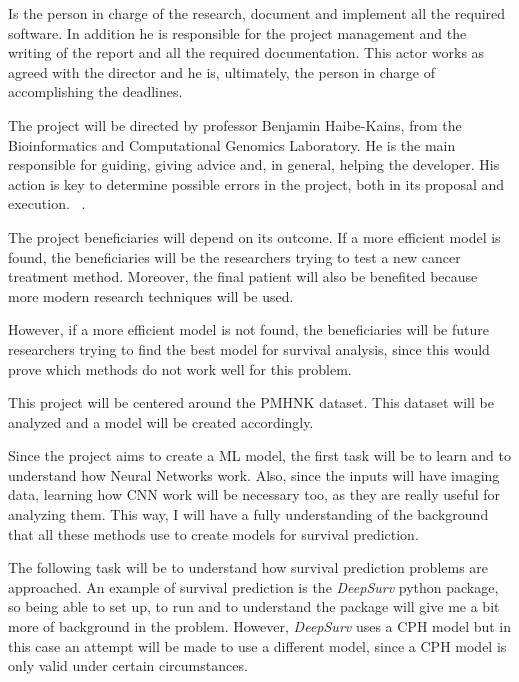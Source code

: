 Is the person in charge of the research, document and implement all the required software.
In addition he is responsible for the project management and the writing of the report
and all the required documentation. This actor works as agreed with the director and
he is, ultimately, the person in charge of accomplishing the deadlines.

The project will be directed by professor Benjamin Haibe-Kains, from the Bioinformatics 
and Computational Genomics Laboratory. He is the main responsible for guiding, giving 
advice and, in general, helping the developer.
His action is key to determine possible errors in the project, both in its proposal and 
execution.
~\cites{bhklab}.

The project beneficiaries will depend on its outcome. If a more efficient model is found, the
beneficiaries will be the researchers trying to test a new cancer treatment method. Moreover,
the final patient will also be benefited because more modern research techniques will be used.

However, if a more efficient model is not found, the beneficiaries will be future researchers
trying to find the best model for survival analysis, since this would prove which 
methods do not work well for this problem.


This project will be centered around the \gls{PMHNK} dataset. This dataset will be analyzed
and a model will be created accordingly.

Since the project aims to create a \gls{ML} model, the first task will be to learn and 
to understand how Neural Networks work. Also, since the inputs will have imaging data, learning
how \gls{CNN} work will be necessary too, as they are really useful for analyzing them. 
This way, I will have a fully understanding of the 
background that all these methods use to create models for survival prediction.

The following task will be to understand how survival prediction problems are approached. An
example of survival prediction is the \emph{DeepSurv} python package, so being able to set 
up, to run and to understand the package will give me a bit more of background in the problem.
However, \emph{DeepSurv} uses a \gls{CPH} model but in this case an attempt will be made to use
a different model, since a \gls{CPH} model is only valid under certain circumstances.
~\cites{medical:deep-surv-github}{medical:cox}

